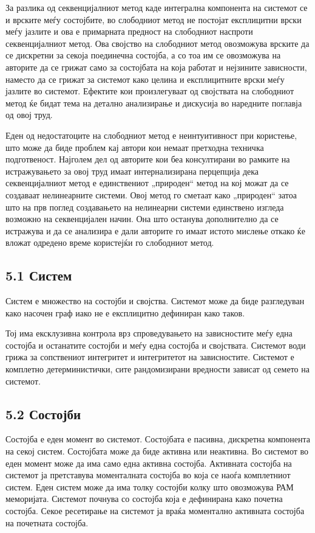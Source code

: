 За разлика од секвенцијалниот метод каде интегрална компонента на системот се и врските меѓу состојбите, во слободниот метод не постојат експлицитни врски меѓу јазлите и ова е примарната предност на слободниот наспроти секвенцијалниот метод. Ова својство на слободниот метод овозможува врските да се дискретни за секоја поединечна состојба, а со тоа им се овозможува на авторите да се грижат само за состојбата на која работат и нејзините зависности, наместо да се грижат за системот како целина и експлицитните врски меѓу јазлите во системот. Ефектите кои произлегуваат од својствата на слободниот метод ќе бидат тема на детално анализирање и дискусија во наредните поглавја од овој труд.

Еден од недостатоците на слободниот метод е неинтуитивност при користење, што може да биде проблем кај автори кои немаат претходна техничка подготвеност. Најголем дел од авторите кои беа консултирани во рамките на истражувањето за овој труд имаат интернализирана перцепција дека секвенцијалниот метод е единствениот „природен“ метод на кој можат да се создаваат нелинеарните системи. Овој метод го сметаат како „природен“ затоа што на прв поглед создавањето на нелинеарни системи единствено изгледа возможно на секвенцијален начин. Она што останува дополнително да се истражува и да се анализира е дали авторите го имаат истото мислење откако ќе вложат одредено време користејќи го слободниот метод.

\subsection{5.1 Систем}

Систем е множество на состојби и својства. Системот може да биде разгледуван како насочен граф иако не е експлицитно дефиниран како таков.

Тој има ексклузивна контрола врз спроведувањето на зависностите меѓу една состојба и останатите состојби и меѓу една состојба и својствата. Системот води грижа за сопствениот интегритет и интегритетот на зависностите. Системот е комплетно детерминистички, сите рандомизирани вредности зависат од семето на системот.

\subsection{5.2 Состојби}

Состојба е еден момент во системот. Состојбата е пасивна, дискретна компонента на секој систем. Состојбата може да биде активна или неактивна. Во системот во еден момент може да има само една активна состојба. Активната состојба на системот ја претставува моменталната состојба во која се наоѓа комплетниот систем. Еден систем може да има толку состојби колку што овозможува РАМ меморијата. Системот почнува со состојба која е дефинирана како почетна состојба. Секое ресетирање на системот ја враќа моментално активната состојба на почетната состојба.

